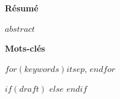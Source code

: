 \medskip

\textbf{Résumé}\par %
$abstract$

\textbf{Mots-clés}\par
$for(keywords)$$it$$sep$, $endfor$ 
 
\vfill %

$if(draft)$
$else$
$endif$


